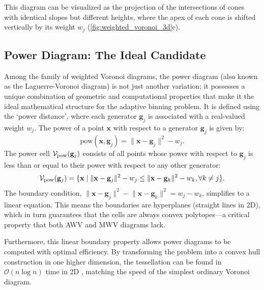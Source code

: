 \documentclass[fleqn,usenatbib]{mnras}
\newcommand{\norm}[1]{\lVert#1\rVert}
\begin{document}
This diagram can be visualized as the projection of the intersections of cones with identical slopes but different heights, where the apex of each cone is shifted vertically by its weight $w_j$ (\autoref{fig:weighted_voronoi_3d}c).

\subsection{Power Diagram: The Ideal Candidate}

Among the family of weighted Voronoi diagrams, the power diagram (also known as the Laguerre-Voronoi diagram) is not just another variation; it possesses a unique combination of geometric and computational properties that make it the ideal mathematical structure for the adaptive binning problem. It is defined using the `power distance', where each generator $\mathbf{g}_j$ is associated with a real-valued weight $w_j$. The power of a point $\mathbf{x}$ with respect to a generator $\mathbf{g}_j$ is given by:
\begin{equation}
\mathrm{pow}(\mathbf{x}, \mathbf{g}_j) = \norm{\mathbf{x} - \mathbf{g}_j}^2 - w_j.
\end{equation}
The power cell $\mathcal{V}_{\rm pow}(\mathbf{g}_j)$ consists of all points whose power with respect to $\mathbf{g}_j$ is less than or equal to their power with respect to any other generator:
\begin{equation}
\mathcal{V}_{\rm pow}(\mathbf{g}_j)=\{\mathbf{x} \mid \norm{\mathbf{x} - \mathbf{g}_j}^2 - w_j \leq \norm{\mathbf{x} - \mathbf{g}_k}^2 - w_k, \forall k \neq j\}.
\end{equation}
The boundary condition, $\norm{\mathbf{x} - \mathbf{g}_j}^2 - \norm{\mathbf{x} - \mathbf{g}_k}^2 = w_j - w_k$, simplifies to a linear equation. This means the boundaries are hyperplanes (straight lines in 2D), which in turn guarantees that the cells are always convex polytopes---a critical property that both AWV and MWV diagrams lack.

Furthermore, this linear boundary property allows power diagrams to be computed with optimal efficiency. By transforming the problem into a convex hull construction in one higher dimension, the tessellation can be found in $\mathcal{O}(n\log n)$ time in 2D \citep{Imai1985,Aurenhammer1987}, matching the speed of the simplest ordinary Voronoi diagram.
\end{document}
